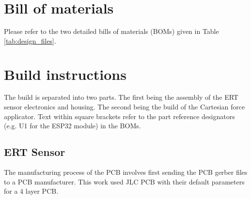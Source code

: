 \section{Bill of materials}
Please refer to the two detailed bills of materials (BOMs) given in Table \ref{tab:design_files}.



\section{Build instructions}
The build is separated into two parts. The first being the assembly of the ERT sensor electronics and housing. The second being the build of the Cartesian force applicator. Text within square brackets refer to the part reference designators (e.g. U1 for the ESP32 module) in the BOMs.


\subsection{ERT Sensor}
The manufacturing process of the PCB involves first sending the PCB gerber files to a PCB manufacturer. This work used JLC PCB with their default parameters for a 4 layer PCB.


